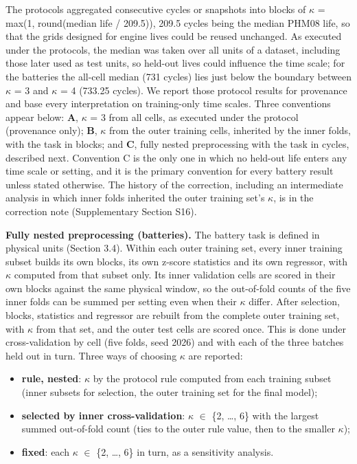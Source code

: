 \documentclass[a4paper,fleqn,doubleblind]{cas-dc}
\begin{document}
The protocols aggregated consecutive cycles or snapshots into blocks of $\kappa$ = max(1, round(median life / 209.5)), 209.5 cycles being the median PHM08 life, so that the grids designed for engine lives could be reused unchanged. As executed under the protocols, the median was taken over all units of a dataset, including those later used as test units, so held-out lives could influence the time scale; for the batteries the all-cell median (731 cycles) lies just below the boundary between $\kappa$ = 3 and $\kappa$ = 4 (733.25 cycles). We report those protocol results for provenance and base every interpretation on training-only time scales. Three conventions appear below: \textbf{A}, $\kappa$ = 3 from all cells, as executed under the protocol (provenance only); \textbf{B}, $\kappa$ from the outer training cells, inherited by the inner folds, with the task in blocks; and \textbf{C}, fully nested preprocessing with the task in cycles, described next. Convention C is the only one in which no held-out life enters any time scale or setting, and it is the primary convention for every battery result unless stated otherwise. The history of the correction, including an intermediate analysis in which inner folds inherited the outer training set's $\kappa$, is in the correction note (Supplementary Section S16).

\textbf{Fully nested preprocessing (batteries).} The battery task is defined in physical units (Section 3.4). Within each outer training set, every inner training subset builds its own blocks, its own z-score statistics and its own regressor, with $\kappa$ computed from that subset only. Its inner validation cells are scored in their own blocks against the same physical window, so the out-of-fold counts of the five inner folds can be summed per setting even when their $\kappa$ differ. After selection, blocks, statistics and regressor are rebuilt from the complete outer training set, with $\kappa$ from that set, and the outer test cells are scored once. This is done under cross-validation by cell (five folds, seed 2026) and with each of the three batches held out in turn. Three ways of choosing $\kappa$ are reported:

\begin{itemize}[leftmargin=1.2em,itemsep=2pt]
\item \textbf{rule, nested}: $\kappa$ by the protocol rule computed from each training subset (inner subsets for selection, the outer training set for the final model);
\item \textbf{selected by inner cross-validation}: $\kappa$ $\in$ \{2, \ldots{}, 6\} with the largest summed out-of-fold count (ties to the outer rule value, then to the smaller $\kappa$);
\item \textbf{fixed}: each $\kappa$ $\in$ \{2, \ldots{}, 6\} in turn, as a sensitivity analysis.
\end{itemize}
\end{document}
